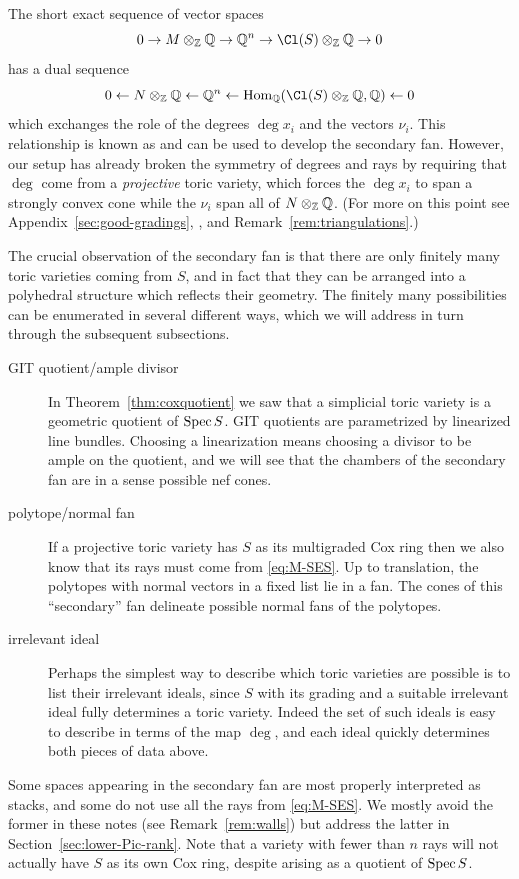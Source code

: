 \documentclass{article}
\begin{document}
The short exact sequence of vector spaces
\[0\to M\otimes_\ZZ\QQ\to\QQ^n\to\Cl(S)\otimes_\ZZ\QQ\to 0\]
has a dual sequence
\[0\gets N\otimes_\ZZ\QQ\gets\QQ^n\gets\Hom_\QQ(\Cl(S)\otimes_\ZZ\QQ,\QQ)\gets 0\]
which exchanges the role of the degrees $\deg x_i$ and the vectors $\nu_i$.  This relationship is known as  and can be used to develop the secondary fan.  However, our setup has already broken the symmetry of degrees and rays by requiring that $\deg$ come from a \emph{projective} toric variety, which forces the $\deg x_i$ to span a strongly convex cone while the $\nu_i$ span all of $N\otimes_\mathbb Z\mathbb Q$.  (For more on this point see Appendix~\ref{sec:good-gradings}, \cite[Proposition~14.3.2]{CLS2011}, and Remark~\ref{rem:triangulations}.)

The crucial observation of the secondary fan is that there are only finitely many toric varieties coming from $S$, and in fact that they can be arranged into a polyhedral structure which reflects their geometry.  The finitely many possibilities can be enumerated in several different ways, which we will address in turn through the subsequent subsections.
\begin{description}
  \item[GIT quotient/ample divisor]  In Theorem~\ref{thm:coxquotient} we saw that a simplicial toric variety is a geometric quotient of $\operatorname{Spec} S$.  GIT quotients are parametrized by linearized line bundles.  Choosing a linearization means choosing a divisor to be ample on the quotient, and we will see that the chambers of the secondary fan are in a sense possible nef cones.
  \item[polytope/normal fan]  If a projective toric variety has $S$ as its multigraded Cox ring then we also know that its rays must come from \eqref{eq:M-SES}.  Up to translation, the polytopes with normal vectors in a fixed list lie in a fan.  The cones of this ``secondary'' fan delineate possible normal fans of the polytopes.
  \item[irrelevant ideal]  Perhaps the simplest way to describe which toric varieties are possible is to list their irrelevant ideals, since $S$ with its grading and a suitable irrelevant ideal fully determines a toric variety.  Indeed the set of such ideals is easy to describe in terms of the map $\deg$, and each ideal quickly determines both pieces of data above.
\end{description}

Some spaces appearing in the secondary fan are most properly interpreted as stacks, and some do not use all the rays from \eqref{eq:M-SES}.  We mostly avoid the former in these notes (see Remark~\ref{rem:walls}) but address the latter in Section~\ref{sec:lower-Pic-rank}.  Note that a variety with fewer than $n$ rays will not actually have $S$ as its own Cox ring, despite arising as a quotient of $\operatorname{Spec} S$.
\end{document}
